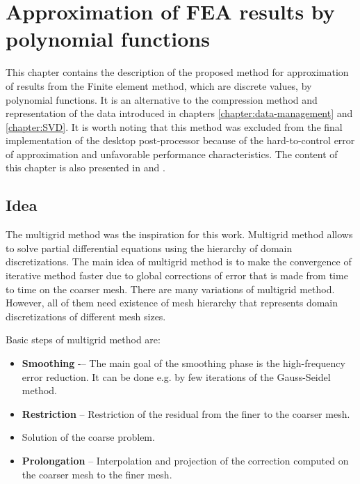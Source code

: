 \chapter{Approximation of FEA results by polynomial functions}
\label{chapter:approximation}


This chapter contains the description of the proposed method for approximation of results from the Finite element method, which are discrete values, by polynomial functions. It is an alternative to the compression method and representation of the data introduced in chapters \ref{chapter:data-management} and \ref{chapter:SVD}. It is worth noting that this method was excluded from the final implementation of the desktop post-processor because of the hard-to-control error of approximation and unfavorable performance characteristics. The content of this chapter is also presented in \cite{Benes2016} and \cite{Benes2016Pollack}.


\section{Idea}

The multigrid method \cite{Briggs2000,Shaidurov2013,Hackbusch2013} was the inspiration for this work. Multigrid method allows to solve partial differential equations using the hierarchy of domain discretizations. The main idea of multigrid method is to make the convergence of iterative method faster due to global corrections of error that is made from time to time on the coarser mesh. There are many variations of multigrid method. However, all of them need existence of mesh hierarchy that represents domain discretizations of different mesh sizes.

Basic steps of multigrid method are:

\begin{itemize}
    \item \textbf{Smoothing} -– The main goal of the smoothing phase is the high-frequency error reduction. It can be done e.g. by few iterations of the Gauss-Seidel method.
    \item \textbf{Restriction} -- Restriction of the residual from the finer to the coarser mesh.
    \item Solution of the coarse problem.
    \item \textbf{Prolongation} -- Interpolation and projection of the correction computed on the coarser mesh to the finer mesh.
\end{itemize}

